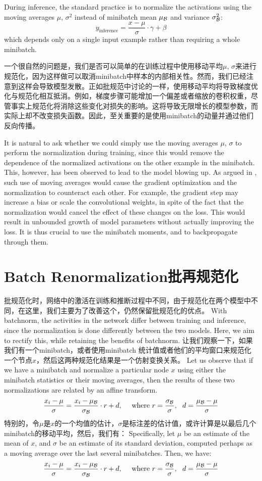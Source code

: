 During inference, the standard practice is to normalize the activations using the moving averages $\mu$, $\sigma^2$ instead of minibatch mean $\mu_{\mathcal{B}}$ and variance $\sigma_{\mathcal{B}}^2$:
$$
y_\text{inference} = \frac{x-\mu}{\sigma}\cdot \gamma + \beta
$$
which depends only on a single input example rather than requiring a whole minibatch.

一个很自然的问题是，我们是否可以简单的在训练过程中使用移动平均$\mu$, $\sigma$来进行规范化，因为这样做可以取消minibatch中样本的内部相关性。然而，我们已经注意到这样会导致模型发散。正如批规范\cite{batchnorm}中讨论的一样，使用移动平均将导致梯度优化与规范化相互抵消。例如，梯度步骤可能增加一个偏差或者缩放的卷积权重，尽管事实上规范化将消除这些变化对损失的影响。这将导致无限增长的模型参数，而实际上却不改变损失函数。因此，至关重要的是使用minibatch的动量并通过他们反向传播。

It is natural to ask whether we could simply use the moving averages $\mu$, $\sigma$ to perform the normalization during training, since this would remove the dependence of the normalized activations on the other example in the minibatch. This, however, has been observed to lead to the model blowing up. As argued in \cite{batchnorm}, such use of moving averages would cause the gradient optimization and the normalization to counteract each other. For example, the gradient step may increase a bias or scale the convolutional weights, in spite of the fact that the normalization would cancel the effect of these changes on the loss. This would result in unbounded growth of model parameters without actually improving the loss. It is thus crucial to use the minibatch moments, and to backpropagate through them.

\section{Batch Renormalization批再规范化}
批规范化时，网络中的激活在训练和推断过程中不同，由于规范化在两个模型中不同，在这里，我们主要为了改善这个，仍然保留批规范化的优点。
With batchnorm, the activities in the network differ between training and inference, since the normalization is done differently between the two models. Here, we aim to rectify this, while retaining  the benefits of batchnorm.
让我们观察一下，如果我们有一个minibatch，或者使用minibatch 统计值或者他们的平均窗口来规范化一个节点$x$，然后这两种规范化结果是一个仿射变换关系。
Let us observe that if we have a minibatch and normalize a particular node  $x$ using either the minibatch statistics or their moving averages, then the results of these two normalizations are related by an affine transform.
$$
\frac{x_i-\mu}{\sigma} = \frac{x_i-\mu_{\mathcal{B}}}{\sigma_{\mathcal{B}}} \cdot r + d,\ \ \ \ \text{where $ r = \frac{\sigma_{\mathcal{B}}}{\sigma}, \ \  d = \frac{\mu_{\mathcal{B}}-\mu}{\sigma}$}
$$
特别的，令$\mu$是$x$的一个均值的估计，$\sigma$是标注差的估计值，或许计算是以最后几个minibatch的移动平均，然后，我们有：
Specifically, let $\mu$ be an estimate of the mean of $x$, and $\sigma$ be an estimate of its standard deviation, computed perhaps as a moving average over the last several minibatches. Then, we have:
$$
\frac{x_i-\mu}{\sigma} = \frac{x_i-\mu_{\mathcal{B}}}{\sigma_{\mathcal{B}}} \cdot r + d,\ \ \ \ \text{where $ r = \frac{\sigma_{\mathcal{B}}}{\sigma}, \ \  d = \frac{\mu_{\mathcal{B}}-\mu}{\sigma}$}
$$

